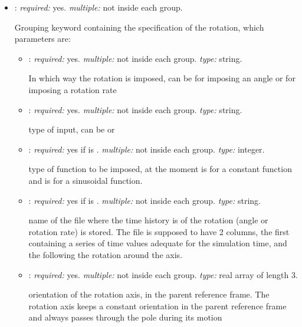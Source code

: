 \begin{itemize}
\item {}: \textit{required:} yes. \textit{multiple:} not inside each 
 group.

Grouping keyword containing the specification of the rotation, which parameters are:

	\begin{itemize}
	\item {}: \textit{required:} yes. \textit{multiple:} not inside each 
     group. \textit{type:} string.
    
    In which way the rotation is imposed, can be  for imposing an angle  
    or  for imposing a rotation rate
    
    \item {}: \textit{required:} yes. \textit{multiple:} not inside 
    each  group. \textit{type:} string.
    
    type of input, can be  or 
    
    \item {}: \textit{required:} yes if  is 
    . \textit{multiple:} not inside each  group. 
    \textit{type:} integer.
    
    type of function to be imposed, at the moment  is for a constant function 
    and  is for a sinusoidal function.
    
        \item {}: \textit{required:} yes if  is 
        . \textit{multiple:} not inside each  group. 
        \textit{type:} string.
        
        name of the file where the time history is of the rotation 
        (angle or rotation rate) is stored. The file is supposed to have 2 columns, 
        the first containing a series of time values adequate for the simulation time, 
        and the following the rotation around the axis. 
        
    \item {}: \textit{required:} yes. \textit{multiple:} not inside each 
     group. \textit{type:} real array of length 3.
    
    orientation of the rotation axis, in the parent reference frame. The rotation 
    axis keeps a constant orientation in the parent reference frame and always passes 
    through the pole during its motion
    

\end{itemize}
\end{itemize}
